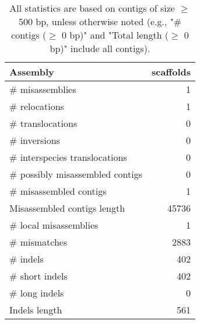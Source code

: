 \documentclass[12pt,a4paper]{article}
\begin{document}
\begin{table}[ht]
\begin{center}
\caption{All statistics are based on contigs of size $\geq$ 500 bp, unless otherwise noted (e.g., "\# contigs ($\geq$ 0 bp)" and "Total length ($\geq$ 0 bp)" include all contigs).}
\begin{tabular}{|l*{1}{|r}|}
\hline
Assembly & scaffolds \\ \hline
\# misassemblies & 1 \\ \hline
\hspace{5mm}\# relocations & 1 \\ \hline
\hspace{5mm}\# translocations & 0 \\ \hline
\hspace{5mm}\# inversions & 0 \\ \hline
\hspace{5mm}\# interspecies translocations & 0 \\ \hline
\# possibly misassembled contigs & 0 \\ \hline
\# misassembled contigs & 1 \\ \hline
Misassembled contigs length & 45736 \\ \hline
\# local misassemblies & 1 \\ \hline
\# mismatches & 2883 \\ \hline
\# indels & 402 \\ \hline
\hspace{5mm}\# short indels & 402 \\ \hline
\hspace{5mm}\# long indels & 0 \\ \hline
Indels length & 561 \\ \hline
\end{tabular}
\end{center}
\end{table}
\end{document}
